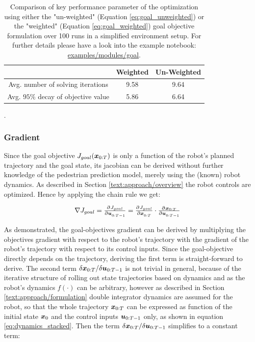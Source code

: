 \begin{table}[!ht]
\begin{center}
\begin{tabular}{c|c|c}
 & Weighted & Un-Weighted \\
\hline
Avg. number of solving iterations & 9.58 & 9.64 \\
\hline
Avg. $95 \%$ decay of objective value & 5.86 & 6.64 \\
\end{tabular}
\caption{Comparison of key performance parameter of the optimization using either the "un-weighted" (Equation \ref{eq:goal_unweighted}) or the "weighted" (Equation  \ref{eq:goal_weighted}) goal objective formulation over 100 runs in a simplified environment setup. For further details please have a look into the example notebook: \href{https://github.com/simon-schaefer/mantrap/blob/master/examples/modules/goal.ipynb}{examples/modules/goal}.}.
\label{table:goal_horizon_weighting}
\end{center}
\end{table}

\subsubsection{Gradient}
Since the goal objective $J_{goal}(\boldsymbol{x}_{0:T})$ is only a function of the robot's planned trajectory and the goal state, its jacobian can be derived without further knowledge of the pedestrian prediction model, merely using the (known) robot dynamics. As described in Section \ref{text:approach/overview} the robot controls are optimized. Hence by applying the chain rule we get: 

\begin{equation}
\nabla J_{goal} = \pd{J_{goal}}{\u_{0:T-1}} = \pd{J_{goal}}{\x_{0:T}} \cdot \pd{\x_{0:T}}{\u_{0:T-1}}
\end{equation}

As demonstrated, the goal-objectives gradient can be derived by multiplying the objectives gradient with respect to the robot's trajectory with the gradient of the robot's trajectory with respect to its control inputs. Since the goal-objective directly depends on the trajectory, deriving the first term is straight-forward to derive. The second term $\delta \boldsymbol{x}_{0:T} / \delta \boldsymbol{u}_{0:T-1}$ is not trivial in general, because of the iterative structure of rolling out state trajectories based on dynamics and as the robot's dynamics $f(\cdot)$ can be arbitrary, however as described in Section \ref{text:approach/formulation} double integrator dynamics are assumed for the robot, so that the whole trajectory $\boldsymbol{x}_{0:T}$ can be expressed as function of the initial state $\boldsymbol{x}_0$ and the control inputs $\boldsymbol{u}_{0:T-1}$ only, as shown in equation \ref{eq:dynamics_stacked}. Then the term $\delta \boldsymbol{x}_{0:T} / \delta \boldsymbol{u}_{0:T-1}$ simplifies to a constant term:

